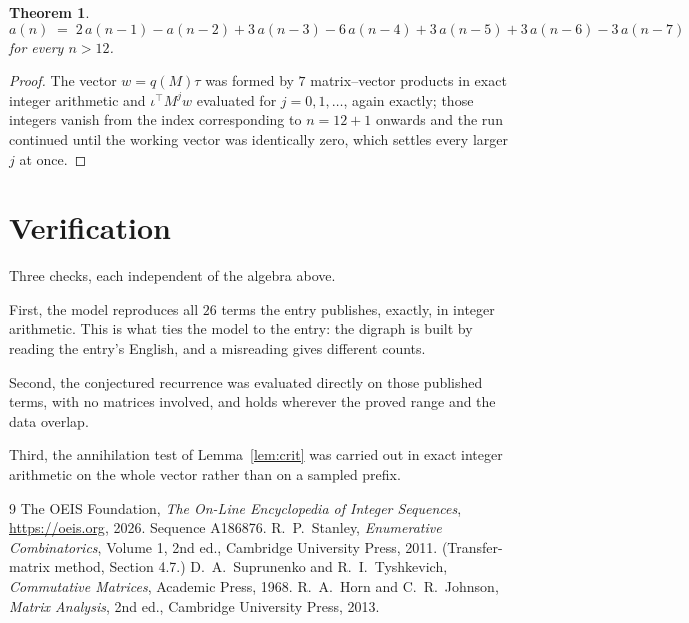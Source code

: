 \documentclass[11pt,a4paper]{article}
\theoremstyle{plain}
\newtheorem{theorem}{Theorem}
\theoremstyle{definition}
\begin{document}
\begin{theorem}
\[
a(n)\;=\;2\,a(n-1) - a(n-2) + 3\,a(n-3) - 6\,a(n-4) + 3\,a(n-5) + 3\,a(n-6) - 3\,a(n-7)
\]
for every $n>12$.
\end{theorem}

\begin{proof}
The vector $w=q(M)\tau$ was formed by $7$ matrix--vector products in exact integer
arithmetic and $\iota^{\!\top}M^{j}w$ evaluated for $j=0,1,\dots$, again exactly; those
integers vanish from the index corresponding to $n=12+1$ onwards and the run continued
until the working vector was identically zero, which settles every larger $j$ at once.
\end{proof}

\section{Verification}

Three checks, each independent of the algebra above.

First, the model reproduces all $26$ terms the entry publishes, exactly, in integer
arithmetic. This is what ties the model to the entry: the digraph is built by reading the
entry's English, and a misreading gives different counts.

Second, the conjectured recurrence was evaluated directly on those published terms, with no
matrices involved, and holds wherever the proved range and the data overlap.

Third, the annihilation test of Lemma~\ref{lem:crit} was carried out in exact integer
arithmetic on the whole vector rather than on a sampled prefix.

\begin{thebibliography}{9}
 The OEIS Foundation, \emph{The On-Line Encyclopedia of Integer
Sequences}, \url{https://oeis.org}, 2026. Sequence A186876.
 R.~P.~Stanley, \emph{Enumerative Combinatorics}, Volume 1, 2nd ed.,
Cambridge University Press, 2011. (Transfer-matrix method, Section 4.7.)
 D.~A.~Suprunenko and R.~I.~Tyshkevich, \emph{Commutative Matrices},
Academic Press, 1968.
 R.~A.~Horn and C.~R.~Johnson, \emph{Matrix Analysis}, 2nd ed., Cambridge
University Press, 2013.
\end{thebibliography}
\end{document}
